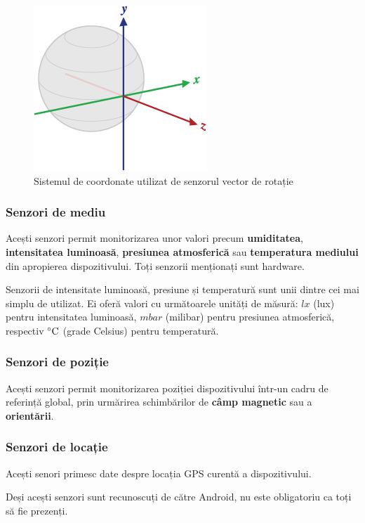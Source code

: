 \documentclass[12pt,a4paper]{article}
\begin{document}
\begin{figure}[hbtp]
\centering
\includegraphics[scale=0.8]{figures/axis_globe.png}
\caption{Sistemul de coordonate utilizat de senzorul vector de rotație}
\end{figure}


\subsubsection{Senzori de mediu}
Acești senzori permit monitorizarea unor valori precum \textbf{umiditatea}, \textbf{intensitatea luminoasă}, \textbf{presiunea atmosferică} sau \textbf{temperatura mediului} din apropierea dispozitivului. Toți senzorii menționați sunt hardware.

Senzorii de intensitate luminoasă, presiune și temperatură sunt unii dintre cei mai simplu de utilizat. Ei oferă valori cu următoarele unități de măsură: $lx$ (lux) pentru intensitatea luminoasă, $mbar$ (milibar) pentru presiunea atmosferică, respectiv $\celsius$ (grade Celsius) pentru temperatură.

\subsubsection{Senzori de poziție}
Acești senzori permit monitorizarea poziției dispozitivului într-un cadru de referință global, prin urmărirea schimbărilor de \textbf{câmp magnetic} sau a \textbf{orientării}.



\subsubsection{Senzori de locație}
Acești senori primesc date despre locația GPS curentă a dispozitivului.



Deși acești senzori sunt recunoscuți de către Android, nu este obligatoriu ca toți să fie prezenți.
\end{document}
